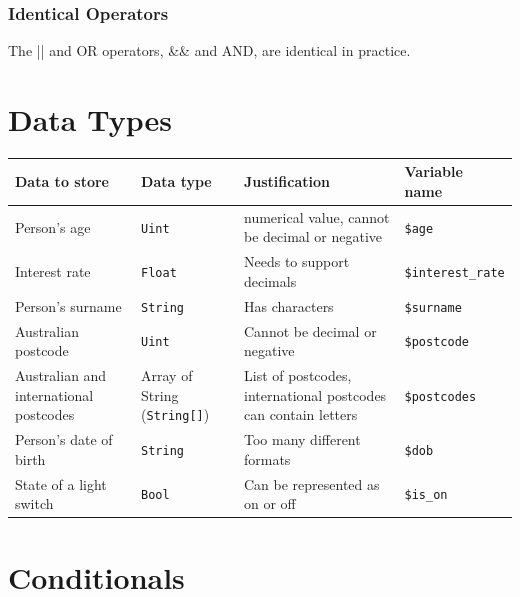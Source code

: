 \documentclass{article}
\begin{document}
        \subsubsection{Identical Operators}
        The || and OR operators, \&\& and AND,  are identical in practice.
    \section[Data Types]{Data Types}
        \begin{center}
            \begin{tabular}{ | m{4cm} | m{3cm} | m{4cm} | m{3cm} | }
                \hline
                Data to store & Data type & Justification & Variable name \\
                \hline
                Person's age & \verb|Uint| & numerical value, cannot be decimal or negative & \verb|$age| \\
                \hline
                Interest rate & \verb|Float| & Needs to support decimals & \verb|$interest_rate| \\
                \hline
                Person's surname & \verb|String| & Has characters & \verb|$surname| \\
                \hline
                Australian postcode & \verb|Uint| & Cannot be decimal or negative & \verb|$postcode| \\
                \hline
                Australian and international postcodes & Array of String (\verb|String[]|) & List of postcodes, international postcodes can contain letters & \verb|$postcodes| \\
                \hline
                Person's date of birth & \verb|String| & Too many different formats & \verb|$dob| \\
                \hline
                State of a light switch & \verb|Bool| & Can be represented as on or off & \verb|$is_on| \\
                \hline
            \end{tabular}
        \end{center}
    \section{Conditionals}
\end{document}
